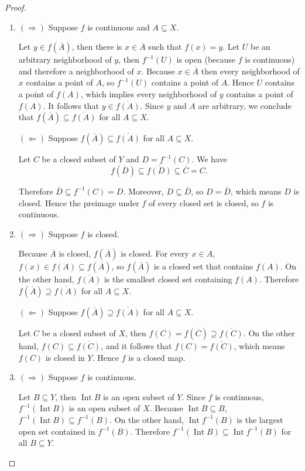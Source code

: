 \begin{proof}
	\begin{enumerate}[label={(\alph*)}]
		\item $(\Rightarrow)$ Suppose $f$ is continuous and $A\subseteq X$.

		      Let $y\in f(\overline{A})$, then there is $x\in\overline{A}$ such that $f(x) = y$. Let $U$ be an arbitrary neighborhood of $y$, then $f^{-1}(U)$ is open (because $f$ is continuous) and therefore a neighborhood of $x$. Because $x\in\overline{A}$ then every neighborhood of $x$ contains a point of $A$, so $f^{-1}(U)$ contains a point of $A$. Hence $U$ contains a point of $f(A)$, which implies every neighborhood of $y$ contains a point of $f(A)$. It follows that $y\in \overline{f(A)}$. Since $y$ and $A$ are arbitrary, we conclude that $f(\overline{A})\subseteq \overline{f(A)}$ for all $A\subseteq X$.

		      $(\Leftarrow)$ Suppose $f(\overline{A})\subseteq \overline{f(A)}$ for all $A\subseteq X$.

		      Let $C$ be a closed subset of $Y$ and $D = f^{-1}(C)$. We have
		      \[
			      f(\overline{D})\subseteq \overline{f(D)} \subseteq \overline{C} = C.
		      \]

		      Therefore $\overline{D}\subseteq f^{-1}(C) = D$. Moreover, $D\subseteq \overline{D}$, so $D = \overline{D}$, which means $D$ is closed. Hence the preimage under $f$ of every closed set is closed, so $f$ is continuous.
		\item $(\Rightarrow)$  Suppose $f$ is closed.

		      Because $\overline{A}$ is closed, $f(\overline{A})$ is closed. For every $x\in A$, $f(x)\in f(A)\subseteq f(\overline{A})$, so $f(\overline{A})$ is a closed set that contains $f(A)$. On the other hand, $\overline{f(A)}$ is the smallest closed set containing $f(A)$. Therefore $f(\overline{A})\supseteq \overline{f(A)}$ for all $A\subseteq X$.

		      $(\Leftarrow)$ Suppose $f(\overline{A})\supseteq \overline{f(A)}$ for all $A\subseteq X$.

		      Let $C$ be a closed subset of $X$, then $f(C) = f(\overline{C}) \supseteq \overline{f(C)}$. On the other hand, $f(C)\subseteq \overline{f(C)}$, and it follows that $f(C) = \overline{f(C)}$, which means $f(C)$ is closed in $Y$. Hence $f$ is a closed map.
		\item $(\Rightarrow)$ Suppose $f$ is continuous.

		      Let $B\subseteq Y$, then $\operatorname{Int} B$ is an open subset of $Y$. Since $f$ is continuous, $f^{-1}(\operatorname{Int} B)$ is an open subset of $X$. Because $\operatorname{Int} B\subseteq B$, $f^{-1}(\operatorname{Int} B) \subseteq f^{-1}(B)$. On the other hand, $\operatorname{Int}f^{-1}(B)$ is the largest open set contained in $f^{-1}(B)$. Therefore $f^{-1}(\operatorname{Int}B) \subseteq \operatorname{Int}f^{-1}(B)$ for all $B\subseteq Y$.


\end{enumerate}
\end{proof}
